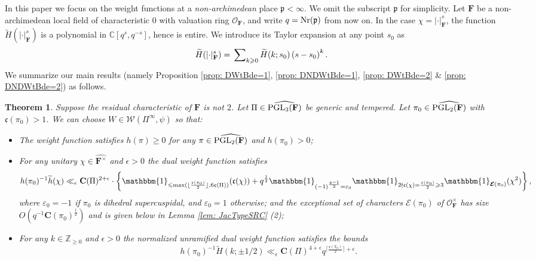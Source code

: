 \documentclass[A4]{amsart}
\def\leq{\leqslant}
\def\geq{\geqslant}
\newtheorem{theorem}             {Theorem}  [section]
\numberwithin{equation}{section} \everymath{\displaystyle}
\newcommand{\Nr}{{\rm Nr}}
\newcommand{\PGL}{{\rm PGL}}
\newcommand{\Z}{\mathbb{Z}}
\newcommand{\id}{\mathbbm{1}}
\newcommand{\C}{\mathbb{C}}
\newcommand{\F}{\mathbf{F}}
\newcommand{\vO}{\mathcal{O}}
\newcommand{\vp}{\mathfrak{p}}
\newcommand{\norm}[1][\cdot]{\lvert #1 \rvert}
\newcommand{\Whi}{\mathcal{W}}
\newcommand{\Cond}{\mathbf{C}}
\newcommand{\cond}{\mathfrak{c}}
\newcommand{\Ecp}{\boldsymbol{\mathcal{E}}}
\begin{document}
	In this paper we focus on the weight functions at a \emph{non-archimedean} place $\vp < \infty$. We omit the subscript $\vp$ for simplicity. Let $\F$ be a non-archimedean local field of characteristic $0$ with valuation ring $\vO_{\F}$, and write $q=\Nr(\vp)$ from now on. In the case $\chi = \norm_{\F}^s$, the function $\widetilde{H}(\norm_{\F}^s)$ is a polynomial in $\C[q^s, q^{-s}]$, hence is entire. We introduce its Taylor expansion at any point $s_0$ as
\begin{equation} \label{eq: DNDWtTaylor}
	\widetilde{H}(\norm_{\F}^s) = \sideset{}{_{k \geq 0}} \sum \widetilde{H}(k; s_0) \left( s - s_0 \right)^k.
\end{equation}
	We summarize our main results (namely Proposition \ref{prop: DWtBde=1}, \ref{prop: DNDWtBde=1}, \ref{prop: DWtBde=2} \& \ref{prop: DNDWtBde=2}) as follows.

\begin{theorem} \label{thm: Main}
	Suppose the residual characteristic of $\F$ is not $2$. Let $\Pi \in \widehat{\PGL_3(\F)}$ be generic and tempered. Let $\pi_0 \in \widehat{\PGL_2(\F)}$ with $\cond(\pi_0) > 1$. We can choose $W \in \Whi(\Pi^{\infty},\psi)$ so that:
\begin{itemize}
	\item[(1)] The weight function satisfies $h(\pi) \geq 0$ for any $\pi \in \widehat{\PGL_2(\F)}$ and $h(\pi_0) > 0$;
	\item[(2)] For any unitary $\chi \in \widehat{\F^{\times}}$ and $\epsilon > 0$ the dual weight function satisfies 
	$$ h(\pi_0)^{-1} \widetilde{h}(\chi) \ll_{\epsilon} \Cond(\Pi)^{2+\epsilon} \cdot \left\{ \id_{\leq \max(\lfloor \frac{\cond(\pi_0)}{2} \rfloor, 6\cond(\Pi))}(\cond(\chi)) + q^{\frac{1}{2}} \id_{(-1)^{\frac{q-1}{2}} = \varepsilon_0} \id_{2 \nmid \cond(\chi) = \frac{\cond(\pi_0)}{2} \geq 3} \id_{\Ecp(\pi_0)}(\chi^2) \right\}, $$
	where $\varepsilon_0 = -1$ if $\pi_0$ is dihedral supercuspidal, and $\varepsilon_0 = 1$ otherwise; and the exceptional set of characters $\Ecp(\pi_0)$ of $\vO_{\F}^{\times}$ has size $O(q^{-1} \Cond(\pi_0)^{\frac{1}{2}})$ and is given below in Lemma \ref{lem: JacTypeSRC} (2);
	\item[(3)] For any $k \in \Z_{\geq 0}$ and $\epsilon > 0$ the normalized unramified dual weight function satisfies the bounds 
	$$ h(\pi_0)^{-1} \widetilde{H}(k; \pm 1/2) \ll_{\epsilon} \Cond(\Pi)^{4+\epsilon} q^{\lceil \frac{\cond(\pi_0)}{2} \rceil + \epsilon}. $$
\end{itemize}
\end{theorem}
\end{document}
